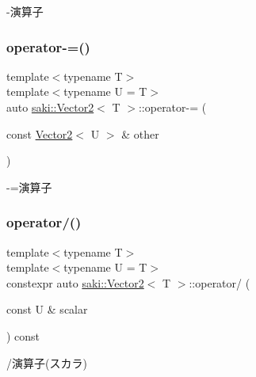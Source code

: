 -\/演算子 

\mbox{\label{classsaki_1_1_vector2_aaf222bfb3a2e02a1570ce2e90c41fdd0}} 
\subsubsection{\texorpdfstring{operator-\/=()}{operator-=()}}
{\footnotesize\ttfamily template$<$typename T$>$ \\
template$<$typename U  = T$>$ \\
auto \mbox{\hyperlink{classsaki_1_1_vector2}{saki\+::\+Vector2}}$<$ T $>$\+::operator-\/= (\begin{DoxyParamCaption}\item[{const \mbox{\hyperlink{classsaki_1_1_vector2}{Vector2}}$<$ U $>$ \&}]{other }\end{DoxyParamCaption})\hspace{0.3cm}{\ttfamily [inline]}}



-\/=演算子 

\mbox{\label{classsaki_1_1_vector2_a6d518ed5e6fa2cf13570c6bb566d0b75}} 
\subsubsection{\texorpdfstring{operator/()}{operator/()}\hspace{0.1cm}{\footnotesize\ttfamily [1/2]}}
{\footnotesize\ttfamily template$<$typename T$>$ \\
template$<$typename U  = T$>$ \\
constexpr auto \mbox{\hyperlink{classsaki_1_1_vector2}{saki\+::\+Vector2}}$<$ T $>$\+::operator/ (\begin{DoxyParamCaption}\item[{const U \&}]{scalar }\end{DoxyParamCaption}) const\hspace{0.3cm}{\ttfamily [inline]}}



/演算子(スカラ) 

\mbox{\label{classsaki_1_1_vector2_afa7038cba7fcdefee0f23dcd18cf8a59}} 
